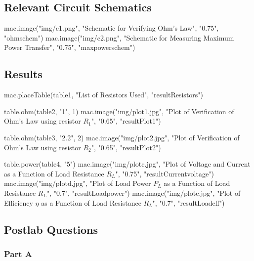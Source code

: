 {%
{%

{%
{%
{%
{%
{%
\subsection{Relevant Circuit Schematics}
\label{sub:Relevant Circuit Schematics}
{{ mac.image("img/c1.png", "Schematic for Verifying Ohm's Law", "0.75", "ohmschem")}}
{{ mac.image("img/c2.png", "Schematic for Measuring Maximum Power Transfer", "0.75", "maxpowerschem")}}

\clearpage

\subsection{Results}
\label{sub:Results}

  {{ mac.placeTable(table1, "List of Resistors Used", "resultResistors")}}

  {{ table.ohm(table2, "1", 1)}}
  {{ mac.image("img/plot1.jpg", "Plot of Verification of Ohm's Law using resistor $R_1$", "0.65", "resultPlot1")}}

  {{ table.ohm(table3, "2.2", 2)}}
  {{ mac.image("img/plot2.jpg", "Plot of Verification of Ohm's Law using resistor $R_2$", "0.65", "resultPlot2")}}

  {{ table.power(table4, "5")}}
  {{ mac.image("img/plotc.jpg", "Plot of Voltage and Current as a Function of Load Resistance $R_L$", "0.75", "resultCurrentvoltage")}}
  {{ mac.image("img/plotd.jpg", "Plot of Load Power $P_L$ as a Function of Load Resistance $R_L$", "0.7", "resultLoadpower")}}
  {{ mac.image("img/plote.jpg", "Plot of Efficiency $\eta$ as a Function of Load Resistance $R_L$", "0.7", "resultLoadeff")}}


\clearpage

\subsection{Postlab Questions}
\label{sub:Postlab Questions}

\subsubsection{Part A}

}}}}}}}
